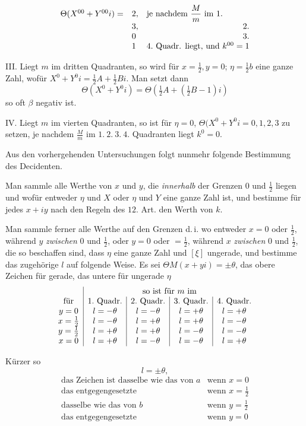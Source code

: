 %
\[
\begin{array}{rll}
\Theta(X^{00}+Y^{00}i)=&2,&\text{je nachdem }\dfrac{M}{m}\text{ im }1.\\
&3,&\hfill2.\\
&0&\hfill3.\\
&1&\hfill4.\text{ Quadr. liegt, und }k^{00}=1
\end{array}
\]

III. Liegt $m$ im dritten Quadranten, so wird für $x=\frac12,y=0$; $\eta=\frac12b$ eine ganze Zahl, wofür $X^0+Y^0i=\frac12A+\frac12Bi$. Man setzt dann
\[
\Theta(X^0+Y^0i)=\Theta(\tfrac12A+(\tfrac12B-1)i)
\]
so oft $\beta$ negativ ist.

IV. Liegt $m$ im vierten Quadranten, so ist für $\eta=0$,
$\Theta(X^0+Y^0i=0,1,2,3$ zu setzen, je nachdem $\frac{M}{m}$ im $1.\ 2.\ 3.\ 4.$ Quadranten liegt
$k^0=0$.

Aus den vorhergehenden Untersuchungen folgt nunmehr folgende Bestimmung des Decidenten.

Man sammle alle Werthe von $x$ und $y$, die \emph{innerhalb} der Grenzen $0$ und $\frac12$ liegen und wofür entweder $\eta$ und $X$ oder $\eta$ und $Y$ eine ganze Zahl ist, und bestimme für jedes $x+iy$ nach den Regeln des $12$. Art. den Werth von $k$.

Man sammle ferner alle Werthe auf den Grenzen d.\,i. wo entweder $x=0$ oder $\frac12$, während $y$ \emph{zwischen} $0$ und $\frac12$, oder $y=0$ oder $=\frac12$, während $x$ \emph{zwischen} $0$ und $\frac12$, die so beschaffen sind, dass $\eta$ eine ganze Zahl und $[\xi]$ ungerade, und bestimme das zugehörige $l$ auf folgende Weise. Es sei $\Theta M(x+yi)=\pm\theta$, das obere Zeichen für gerade, das untere für ungerade $\eta$
\[
\begin{array}{c|c|c|c|c}
&\multicolumn{4}{c}{\text{so ist für }m\text{ im}}\\
\text{für}&1.\text{ Quadr.}&2.\text{ Quadr.}&3.\text{ Quadr.}&4.\text{ Quadr.}\\
y=0&l=-\theta&l=-\theta&l=+\theta&l=+\theta\\
x=\frac12&l=-\theta&l=+\theta&l=+\theta&l=-\theta\\
y=\frac12&l=+\theta&l=+\theta&l=-\theta&l=-\theta\\
x=0&l=+\theta&l=-\theta&l=-\theta&l=+\theta
\end{array}
\]

%
Kürzer so
\[
l=\pm\theta,
\]
\[
\begin{array}{ll}
\text{das Zeichen ist dasselbe wie das von }a&\text{wenn }x=0\\
\text{das entgegengesetzte}&\text{wenn }x=\frac12\\
\text{dasselbe wie das von }b&\text{wenn }y=\frac12\\
\text{das entgegengesetzte}&\text{wenn }y=0
\end{array}
\]

